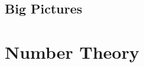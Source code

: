 \documentclass[a4paper, 12pt, oneside]{memoir}
\begin{document}
\section{Big Pictures}



\chapter{Number Theory}
\thispagestyle{empty}











\printindex[prob]
\printindex[thm]
\printindex[def]
\printindex[strat]
\printindex
\end{document}
